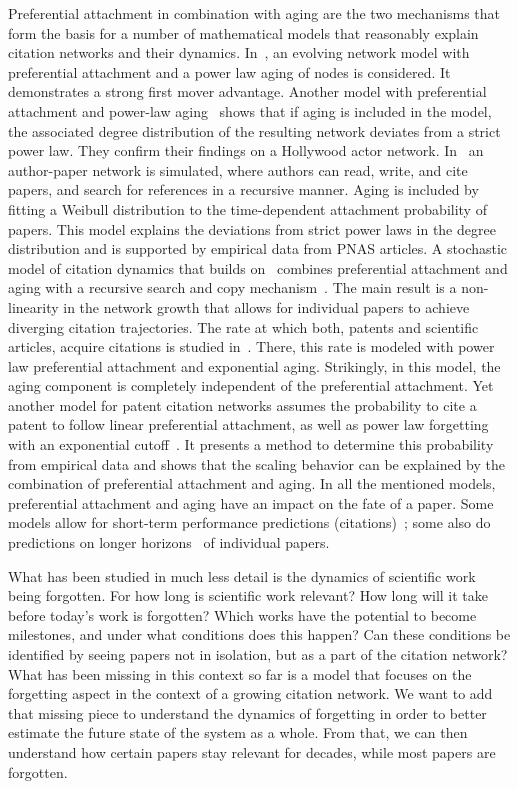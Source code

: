 \documentclass[fleqn,10pt]{wlscirep}
\begin{document}
Preferential attachment in combination with aging are the two mechanisms that form the basis for a number of mathematical models that reasonably explain citation networks and their dynamics. In~\cite{Dorogovtsev2000}, an evolving network model with preferential attachment and a power law aging of nodes is considered. It demonstrates a strong first mover advantage. Another model with preferential attachment and power-law aging~\cite{Safdari2016} shows that if aging is included in the model, the associated degree distribution of the resulting network deviates from a strict power law. They confirm their findings on a Hollywood actor network. In~\cite{Borner2004} an author-paper network is simulated, where authors can read, write, and cite papers, and search for references in a recursive manner. Aging is included by fitting a Weibull distribution to the time-dependent attachment probability of papers. This model explains the deviations from strict power laws in the degree distribution and is supported by empirical data from PNAS articles. A stochastic model of citation dynamics that builds on~\cite{Borner2004} combines preferential attachment and aging with a recursive search and copy mechanism~\cite{Golosovsky2017}. The main result is a non-linearity in the network growth that allows for individual papers to achieve diverging citation trajectories.  The rate at which both, patents and scientific articles, acquire citations is studied in~\cite{Higham2017, Higham2017_2}. There, this rate is modeled with power law preferential attachment and exponential aging. Strikingly, in this model, the aging component is completely independent of the preferential attachment.  Yet another model for patent citation networks assumes the probability to cite a patent to follow linear preferential attachment, as well as power law forgetting with an exponential cutoff~\cite{Valverde2007}. It presents a method to determine this probability from empirical data and shows that the scaling behavior can be explained by the combination of preferential attachment and aging. In all the mentioned models, preferential attachment and aging have an impact on the fate of a paper. Some models allow for short-term performance predictions (citations)~\cite{Newman_2014x, Golosovsky2017, Higham2017_2}; some also do  predictions on longer horizons~\cite{Wang2013x} of individual papers. 

What has been studied in much less detail is the dynamics of scientific work being forgotten. For how long is scientific work relevant?  How long will it take before today’s work is forgotten? Which works have the potential to become milestones, and under what conditions does this happen? Can these conditions be identified by seeing papers not in isolation, but as a part of the citation network? 
What has been missing in this context so far is a model that focuses on the forgetting aspect in the context of a growing citation network. We want to add that missing piece to understand the dynamics of forgetting in order to better estimate the future state of the system as a whole. From that, we can then understand how certain papers stay relevant for  decades, while most papers are forgotten.
\end{document}
